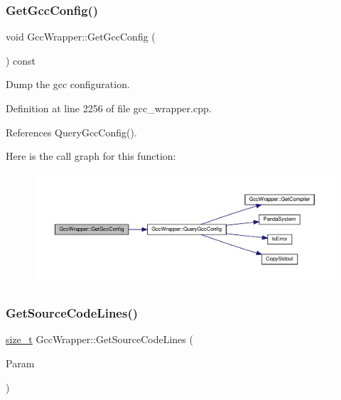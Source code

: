 \subsubsection{\texorpdfstring{Get\+Gcc\+Config()}{GetGccConfig()}}
{\footnotesize\ttfamily void Gcc\+Wrapper\+::\+Get\+Gcc\+Config (\begin{DoxyParamCaption}{ }\end{DoxyParamCaption}) const}



Dump the gcc configuration. 



Definition at line 2256 of file gcc\+\_\+wrapper.\+cpp.



References Query\+Gcc\+Config().

Here is the call graph for this function\+:
\nopagebreak
\begin{figure}[H]
\begin{center}
\leavevmode
\includegraphics[width=350pt]{d4/dbf/classGccWrapper_ab7fc5dafe65775ce866c205c60fd8413_cgraph}
\end{center}
\end{figure}
\mbox{\label{classGccWrapper_aaea934b26fbfbd9e8ff802b9efc87b7f}} 
\subsubsection{\texorpdfstring{Get\+Source\+Code\+Lines()}{GetSourceCodeLines()}}
{\footnotesize\ttfamily \hyperlink{tutorial__fpt__2017_2intro_2sixth_2test_8c_a7c94ea6f8948649f8d181ae55911eeaf}{size\+\_\+t} Gcc\+Wrapper\+::\+Get\+Source\+Code\+Lines (\begin{DoxyParamCaption}\item[{const \hyperlink{Parameter_8hpp_a37841774a6fcb479b597fdf8955eb4ea}{Parameter\+Const\+Ref}}]{Param }\end{DoxyParamCaption})\hspace{0.3cm}{\ttfamily [static]}}



